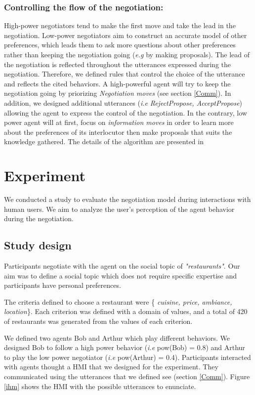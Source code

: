 \documentclass[runningheads,a4paper]{llncs}
\begin{document}
	\subsubsection{Controlling the flow of the negotiation:}
	High-power negotiators tend to make the first move \cite{magee2007power} and take the lead in the negotiation. Low-power negotiators aim to construct an accurate model of other preferences, which leads them to ask more questions about other preferences rather than keeping the negotiation going (\emph{e.g} by making proposals)\cite{de2004influence}.
	The lead of the negotiation is reflected throughout the utterances expressed during the negotiation. Therefore, we defined rules that control the choice of the utterance and reflects the cited behaviors. A high-powerful agent will try to keep the negotiation going by priorizing \emph{Negotiation moves} (see section \ref{Comm}). In addition, we designed additional utterances (\textit{i.e} \emph{RejectPropose, AcceptPropose}) allowing the agent to express the control of the negotiation.
	In the contrary, low power agent will at first, focus on \emph{information moves} in order to learn more about the preferences of its interlocutor then make proposals that suits the knowledge gathered. 
	The details of the algorithm are presented in \cite {ouali2017computational}
	
\section{Experiment}
	We conducted a study to evaluate the negotiation model during interactions with human users. We aim to analyze the user's perception of the agent behavior during the negotiation.
	
	\subsection{Study design}
		
		Participants negotiate with the agent on the social topic of \emph{"restaurants"}. Our aim was to define a social topic which does not require specific expertise and participants have personal preferences.
		
		The criteria defined to choose a restaurant were \{ \textit{cuisine, price, ambiance, location}\}. Each criterion was defined with a domain of values, and a total of 420 of restaurants was generated from the values of each criterion.
		
		We defined two agents Bob and Arthur which play different behaviors. We designed Bob to follow a high power behavior (\textit{i.e} pow(Bob) = 0.8) and Arthur to play the low power negotiator (\textit{i.e} pow(Arthur) = 0.4).
		Participants interacted with agents thought a HMI that we designed for the experiment. They communicated using the utterances that we defined see (section \ref{Comm}). Figure \ref{ihm} shows the HMI with the possible utterances to enunciate.
		
\end{document}
